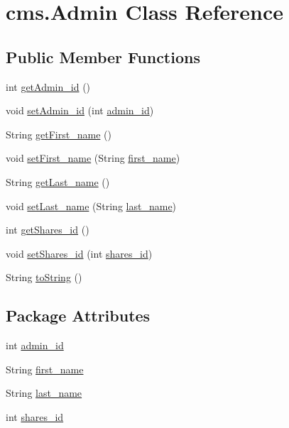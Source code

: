 \hypertarget{classcms_1_1_admin}{}\section{cms.\+Admin Class Reference}
\label{classcms_1_1_admin}
\subsection*{Public Member Functions}
\begin{DoxyCompactItemize}
\item 
int \mbox{\hyperlink{classcms_1_1_admin_afece0488f4a49fb49db0f80192296755}{get\+Admin\+\_\+id}} ()
\item 
void \mbox{\hyperlink{classcms_1_1_admin_a898049bf40a6dd20992f6e271cdfdccf}{set\+Admin\+\_\+id}} (int \mbox{\hyperlink{classcms_1_1_admin_af3be9e8376e013a240ae51c28e7e8d6e}{admin\+\_\+id}})
\item 
String \mbox{\hyperlink{classcms_1_1_admin_a5fc8f96c91c2895c0324698dc3e99298}{get\+First\+\_\+name}} ()
\item 
void \mbox{\hyperlink{classcms_1_1_admin_a36721754a671a55dfe4b57e02a45f7c8}{set\+First\+\_\+name}} (String \mbox{\hyperlink{classcms_1_1_admin_ad476f88383b7c36bfbd70be502be4202}{first\+\_\+name}})
\item 
String \mbox{\hyperlink{classcms_1_1_admin_af6c98bd18bd823c8681d2829ef7e5c1c}{get\+Last\+\_\+name}} ()
\item 
void \mbox{\hyperlink{classcms_1_1_admin_a713b40166c6c00ba4df46643d3ae5be2}{set\+Last\+\_\+name}} (String \mbox{\hyperlink{classcms_1_1_admin_abe31ed0d83c09185e6e4f6c1a3d3c685}{last\+\_\+name}})
\item 
int \mbox{\hyperlink{classcms_1_1_admin_a589025775cbda46a854d957aec6e1d83}{get\+Shares\+\_\+id}} ()
\item 
void \mbox{\hyperlink{classcms_1_1_admin_ab98a8c143d4b3f4f4a49cfec7a8c9d78}{set\+Shares\+\_\+id}} (int \mbox{\hyperlink{classcms_1_1_admin_a1f31a081502c0d05fef837eb1b36b157}{shares\+\_\+id}})
\item 
String \mbox{\hyperlink{classcms_1_1_admin_a826310023a7b65760ed8b708c6ce198c}{to\+String}} ()
\end{DoxyCompactItemize}
\subsection*{Package Attributes}
\begin{DoxyCompactItemize}
\item 
int \mbox{\hyperlink{classcms_1_1_admin_af3be9e8376e013a240ae51c28e7e8d6e}{admin\+\_\+id}}
\item 
String \mbox{\hyperlink{classcms_1_1_admin_ad476f88383b7c36bfbd70be502be4202}{first\+\_\+name}}
\item 
String \mbox{\hyperlink{classcms_1_1_admin_abe31ed0d83c09185e6e4f6c1a3d3c685}{last\+\_\+name}}
\item 
int \mbox{\hyperlink{classcms_1_1_admin_a1f31a081502c0d05fef837eb1b36b157}{shares\+\_\+id}}
\end{DoxyCompactItemize}


